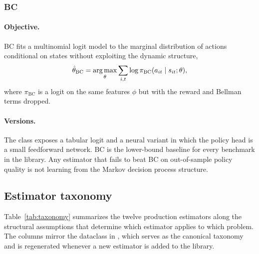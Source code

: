 \subsubsection{BC}

\paragraph{Objective.} BC fits a multinomial logit model to the marginal distribution of actions conditional on states without exploiting the dynamic structure,
\begin{equation}
\hat\theta_{\mathrm{BC}} = \operatorname*{arg\,max}_\theta \sum_{i, t} \log \pi_{\mathrm{BC}}(a_{it} \mid s_{it}; \theta),
\label{eq:bc}
\end{equation}
where $\pi_{\mathrm{BC}}$ is a logit on the same features $\phi$ but with the reward and Bellman terms dropped.

\paragraph{Versions.} The  class exposes a tabular logit and a neural variant in which the policy head is a small feedforward network. BC is the lower-bound baseline for every benchmark in the library. Any estimator that fails to beat BC on out-of-sample policy quality is not learning from the Markov decision process structure.

\subsection{Estimator taxonomy}

Table~\ref{tab:taxonomy} summarizes the twelve production estimators along the structural assumptions that determine which estimator applies to which problem. The columns mirror the  dataclass in , which serves as the canonical taxonomy and is regenerated whenever a new estimator is added to the library.

